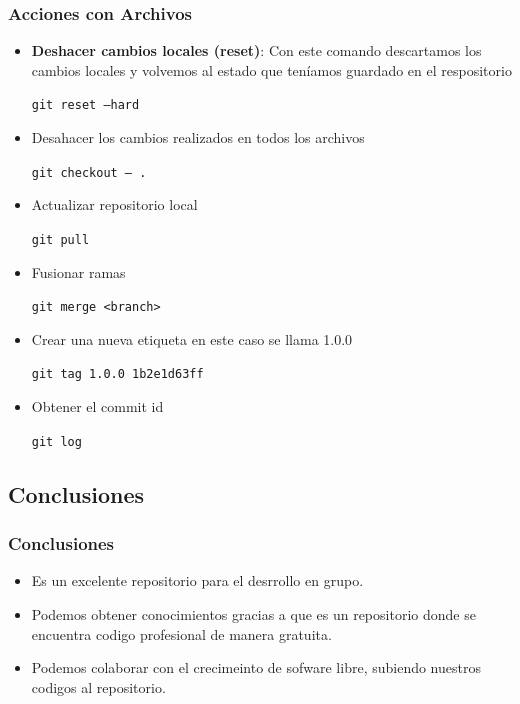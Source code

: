 \documentclass{beamer}
\begin{document}
	\begin{frame}
		\frametitle{Acciones con Archivos}
		\begin{itemize}
			\item \textbf{Deshacer cambios locales (reset)}: Con este comando descartamos los cambios locales y volvemos al estado que teníamos guardado en el respositorio
			\begin{center}
				 {\tt \scriptsize git reset --hard}\\
			\end{center}
			\item Desahacer los cambios realizados en todos los archivos
			\begin{center}
				 {\tt \scriptsize git checkout -- .}\\
			\end{center}
			\item Actualizar repositorio local
			\begin{center}
				 {\tt \scriptsize git pull}\\	 
			\end{center}
			\item Fusionar ramas
			\begin{center}
				 {\tt \scriptsize git merge <branch>}\\	 
			\end{center}
			\item Crear una nueva etiqueta en este caso se llama 1.0.0
			\begin{center}
				 {\tt \scriptsize git tag 1.0.0 1b2e1d63ff}\\	 
			\end{center}
			\item Obtener el commit id
			\begin{center}
				 {\tt \scriptsize git log}\\	 
			\end{center}
		\end{itemize}
	\end{frame}

\subsection{Conclusiones}
\begin{frame}
\frametitle{Conclusiones}
	\begin{itemize}
			\item Es un excelente repositorio para el desrrollo en grupo.
			\item Podemos obtener conocimientos gracias a que es un repositorio donde se encuentra codigo profesional de manera gratuita.
			\item Podemos colaborar con el crecimeinto de sofware libre, subiendo nuestros codigos al repositorio.
		\end{itemize}
\end{frame}
\end{document}
